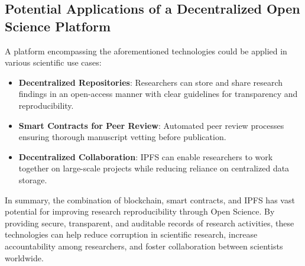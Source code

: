 \subsection{Potential Applications of a Decentralized Open Science Platform}

A platform encompassing the aforementioned technologies could be applied in various scientific use cases:

\begin{itemize}
    \item \textbf{Decentralized Repositories}: Researchers can store and share research findings in an open-access manner with clear guidelines for transparency and reproducibility.
    \item \textbf{Smart Contracts for Peer Review}: Automated peer review processes ensuring thorough manuscript vetting before publication.
    \item \textbf{Decentralized Collaboration}: IPFS can enable researchers to work together on large-scale projects while reducing reliance on centralized data storage.
\end{itemize}

In summary, the combination of blockchain, smart contracts, and IPFS has vast potential for improving research reproducibility through Open Science. By providing secure, transparent, and auditable records of research activities, these technologies can help reduce corruption in scientific research, increase accountability among researchers, and foster collaboration between scientists worldwide.
